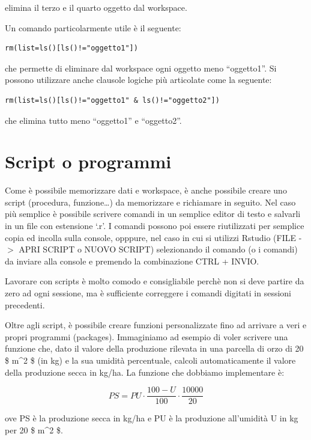 \documentclass[a4paper,12pt,oneside]{book}
\begin{document}
elimina il terzo e il quarto oggetto dal workspace.

Un comando particolarmente utile è il seguente:

\begin{verbatim}
rm(list=ls()[ls()!="oggetto1"])
\end{verbatim}

che permette di eliminare dal workspace ogni oggetto meno ``oggetto1''. Si possono utilizzare anche clausole logiche più articolate come la seguente:

\begin{verbatim}
rm(list=ls()[ls()!="oggetto1" & ls()!="oggetto2"])
\end{verbatim}

che elimina tutto meno ``oggetto1'' e ``oggetto2''.

\hypertarget{script-o-programmi}{%
\section*{Script o programmi}\label{script-o-programmi}}

Come è possibile memorizzare dati e workspace, è anche possibile creare uno script (procedura, funzione\ldots{}) da memorizzare e richiamare in seguito. Nel caso più semplice è possibile scrivere comandi in un semplice editor di testo e salvarli in un file con estensione `.r'. I comandi possono poi essere riutilizzati per semplice copia ed incolla sulla console, opppure, nel caso in cui si utilizzi Rstudio (FILE -\(>\) APRI SCRIPT o NUOVO SCRIPT) selezionando il comando (o i comandi) da inviare alla console e premendo la combinazione CTRL + INVIO.

Lavorare con scripts è molto comodo e consigliabile perchè non si deve partire da zero ad ogni sessione, ma è sufficiente correggere i comandi digitati in sessioni precedenti.

Oltre agli script, è possibile creare funzioni personalizzate fino ad arrivare a veri e propri programmi (packages). Immaginiamo ad esempio di voler scrivere una funzione che, dato il valore della produzione rilevata in una parcella di orzo di 20 \$ m\^{}2 \$ (in kg) e la sua umidità percentuale, calcoli automaticamente il valore della
produzione secca in kg/ha. La funzione che dobbiamo implementare è:

\[
PS = PU \cdot \frac{100 - U}{100} \cdot \frac{10000}{20}
\]

ove PS è la produzione secca in kg/ha e PU è la produzione all'umidità U in kg per 20 \$ m\^{}2 \$.
\end{document}
